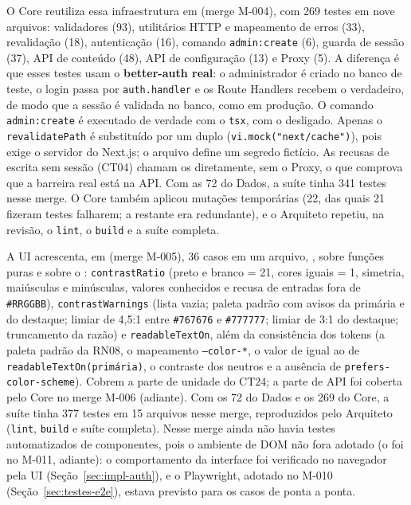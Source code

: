 O Core reutiliza essa infraestrutura em  (merge M-004), com 269 testes em nove arquivos: validadores (93), utilitários HTTP e mapeamento de erros (33), revalidação (18), autenticação (16), comando \texttt{admin:create} (6), guarda de sessão (37), API de conteúdo (48), API de configuração (13) e Proxy (5). A diferença é que esses testes usam o \textbf{better-auth real}: o administrador é criado no banco de teste, o login passa por \texttt{auth.handler} e os Route Handlers recebem o  verdadeiro, de modo que a sessão é validada no banco, como em produção. O comando \texttt{admin:create} é executado de verdade com o \texttt{tsx}, com o  desligado. Apenas o \texttt{revalidatePath} é substituído por um duplo (\texttt{vi.mock("next/cache")}), pois exige o servidor do Next.js; o arquivo  define um segredo fictício. As recusas de escrita sem sessão (CT04) chamam os  diretamente, sem o Proxy, o que comprova que a barreira real está na API. Com as 72 do Dados, a suíte tinha 341 testes nesse merge. O Core também aplicou mutações temporárias (22, das quais 21 fizeram testes falharem; a restante era redundante), e o Arquiteto repetiu, na revisão, o \texttt{lint}, o \texttt{build} e a suíte completa.

A UI acrescenta, em  (merge M-005), 36 casos em um arquivo, , sobre funções puras e sobre o : \texttt{contrastRatio} (preto e branco = 21, cores iguais = 1, simetria, maiúsculas e minúsculas, valores conhecidos e recusa de entradas fora de \texttt{\#RRGGBB}), \texttt{contrastWarnings} (lista vazia; paleta padrão com avisos da primária e do destaque; limiar de 4,5:1 entre \texttt{\#767676} e \texttt{\#777777}; limiar de 3:1 do destaque; truncamento da razão) e \texttt{readableTextOn}, além da consistência dos tokens (a paleta padrão da RN08, o mapeamento \texttt{--color-*}, o valor de  igual ao de \texttt{readableTextOn(primária)}, o contraste dos neutros e a ausência de \texttt{prefers-color-scheme}). Cobrem a parte de unidade do CT24; a parte de API foi coberta pelo Core no merge M-006 (adiante). Com os 72 do Dados e os 269 do Core, a suíte tinha 377 testes em 15 arquivos nesse merge, reproduzidos pelo Arquiteto (\texttt{lint}, \texttt{build} e suíte completa). Nesse merge ainda não havia testes automatizados de componentes, pois o ambiente de DOM não fora adotado (o foi no M-011, adiante): o comportamento da interface foi verificado no navegador pela UI (Seção~\ref{sec:impl-auth}), e o Playwright, adotado no M-010 (Seção~\ref{sec:testes-e2e}), estava previsto para os casos de ponta a ponta.

